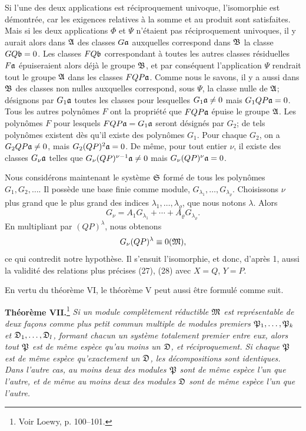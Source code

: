 Si l'une des deux applications est réciproquement univoque, l'isomorphie est démontrée, car les exigences relatives à la somme et au produit sont satisfaites. Mais si les deux applications $\Phi$ et $\Psi$ n'étaient pas réciproquement univoques, il y aurait alors dans $\mathfrak{A}$ des classes $G\mathfrak{a}$ auxquelles correspond dans $\mathfrak{B}$ la classe $GQ\mathfrak{b}=0$. Les classes $FQ\mathfrak{b}$ correspondant à toutes les autres classes résiduelles $F\mathfrak{a}$ épuiseraient alors déjà le groupe $\mathfrak{B}$, et par conséquent l'application $\Psi$ rendrait tout le groupe $\mathfrak{A}$ dans les classes $FQP\mathfrak{a}$. Comme nous le savons, il y a aussi dans $\mathfrak{B}$ des classes non nulles auxquelles correspond, sous $\Psi$, la classe nulle de $\mathfrak{A}$; désignons par $G_1\mathfrak{a}$ toutes les classes pour lesquelles $G_1\mathfrak{a}\ne0$ mais $G_1QP\mathfrak{a}=0$. Tous les autres polynômes $F$ ont la propriété que $FQP\mathfrak{a}$ épuise le groupe $\mathfrak{A}$. Les polynômes $F$ pour lesquels $FQP\mathfrak{a}=G_1\mathfrak{a}$ seront désignés par $G_2$; de tels polynômes existent dès qu'il existe des polynômes $G_1$. Pour chaque $G_2$, on a $G_2QP\mathfrak{a}\ne0$, mais $G_2(QP)^2\mathfrak{a}=0$. De même, pour tout entier $\nu$, il existe des classes $G_\nu\mathfrak{a}$ telles que $G_\nu(QP)^{\nu-1}\mathfrak{a}\ne0$ mais $G_\nu(QP)^\nu\mathfrak{a}=0$.

Nous considérons maintenant le système $\mathfrak{S}$ formé de tous les polynômes $G_1,G_2,\ldots$. Il possède une base finie comme module, $G_{\lambda_1},\ldots,G_{\lambda_\varrho}$. Choisissons $\nu$ plus grand que le plus grand des indices $\lambda_1,\ldots,\lambda_\varrho$, que nous notons $\lambda$. Alors
\[
 G_\nu=A_1G_{\lambda_1}+\cdots+A_\varrho G_{\lambda_\varrho}.
\]
En multipliant par $(QP)^\lambda$, nous obtenons
\[
 G_\nu(QP)^\lambda\equiv0(\mathfrak{M}),
\]
ce qui contredit notre hypothèse. Il s'ensuit l'isomorphie, et donc, d'après 1, aussi la validité des relations plus précises (27), (28) avec $X=Q$, $Y=P$.

En vertu du théorème VI, le théorème V peut aussi être formulé comme suit.

\textbf{Théorème VII.}\footnote{Voir Loewy, p. 100--101.} \emph{Si un module complètement réductible $\mathfrak{M}$ est représentable de deux façons comme plus petit commun multiple de modules premiers $\mathfrak P_1,\ldots,\mathfrak P_k$ et $\mathfrak{D}_1,\ldots,\mathfrak{D}_l$, formant chacun un système totalement premier entre eux, alors tout $\mathfrak P$ est de même espèce qu'au moins un $\mathfrak{D}$, et réciproquement. Si chaque $\mathfrak P$ est de même espèce qu'exactement un $\mathfrak{D}$, les décompositions sont identiques. Dans l'autre cas, au moins deux des modules $\mathfrak P$ sont de même espèce l'un que l'autre, et de même au moins deux des modules $\mathfrak{D}$ sont de même espèce l'un que l'autre.}
